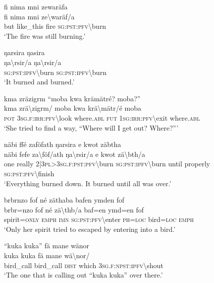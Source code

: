 \ea\label{ex:7:a4844}
fi nima mni zewaräfa\\
\gll fi	nima	mni	ze{\textbackslash}waräf/a\\
     but	like\_this	fire	\textsc{sg}:\textsc{pst}:\textsc{pfv}{\textbackslash}burn\\
\glt `The fire was still burning.'
\z

\ea\label{ex:7:a4845}
ŋarsira ŋasira\\
\gll ŋa{\textbackslash}rsir/a	ŋa{\textbackslash}rsir/a\\
     \textsc{sg}:\textsc{pst}:\textsc{ipfv}{\textbackslash}burn	\textsc{sg}:\textsc{pst}:\textsc{ipfv}{\textbackslash}burn\\
\glt `It burned and burned.'
\z

\ea\label{ex:7:a4846}
kma zräzigrm ``moba kwa krämätré? moba?''\\
\gll kma	zrä{\textbackslash}zigrm/	moba	kwa	krä{\textbackslash}mätr/é	moba\\
     \textsc{pot}	3\textsc{sg}.\textsc{f}:\textsc{irr}:\textsc{pfv}{\textbackslash}look	where.\textsc{abl}	\textsc{fut}	1\textsc{sg}:\textsc{irr}:\textsc{pfv}{\textbackslash}exit	where.\textsc{abl}\\
\glt `She tried to find a way, ``Where will I get out? Where?'''
\z

\ea\label{ex:7:a4847}
näbi ffé zaföfath ŋarsira e kwot zäbtha\\
\gll näbi	fefe	za{\textbackslash}föf/ath	ŋa{\textbackslash}rsir/a	e	kwot	zä{\textbackslash}bth/a\\
     one	really	2|3\textsc{pl}>3\textsc{sg}.\textsc{f}:\textsc{pst}:\textsc{pfv}{\textbackslash}burn	\textsc{sg}:\textsc{pst}:\textsc{ipfv}{\textbackslash}burn	until	properly	\textsc{sg}:\textsc{pst}:\textsc{pfv}{\textbackslash}finish\\
\glt `Everything burned down. It burned until all was over.'
\z

\ea\label{ex:7:a4849}
brbrnzo fof né zäthaba bafen ymden fof\\
\gll brbr=nzo	fof	né	zä{\textbackslash}thb/a	baf=en	ymd=en	fof\\
     spirit=\textsc{only}	\textsc{emph}	\textsc{imn}	\textsc{sg}:\textsc{pst}:\textsc{pfv}{\textbackslash}enter	\textsc{ph}=\textsc{loc}	bird=\textsc{loc}	\textsc{emph}\\
\glt `Only her spirit tried to escaped by entering into a bird.'
\z

\ea\label{ex:7:a10160}
``kuka kuka'' fä mane wänor\\
\gll kuka	kuka	fä	mane	wä{\textbackslash}nor/\\
     bird\_call	bird\_call	\textsc{dist}	which	3\textsc{sg}.\textsc{f}:\textsc{npst}:\textsc{ipfv}{\textbackslash}shout\\
\glt `The one that is calling out ``kuka kuka'' over there.'
\z

